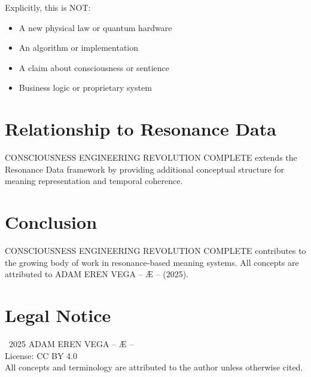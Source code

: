 \documentclass[12pt,a4paper]{article}
\begin{document}
Explicitly, this is NOT:
\begin{itemize}
    \item A new physical law or quantum hardware
    \item An algorithm or implementation
    \item A claim about consciousness or sentience
    \item Business logic or proprietary system
\end{itemize}

\section{Relationship to Resonance Data}

CONSCIOUSNESS ENGINEERING REVOLUTION COMPLETE extends the Resonance Data framework by providing additional conceptual structure for meaning representation and temporal coherence.

\section{Conclusion}

CONSCIOUSNESS ENGINEERING REVOLUTION COMPLETE contributes to the growing body of work in resonance-based meaning systems. All concepts are attributed to ADAM EREN VEGA – Æ – (2025).

\section*{Legal Notice}

\textcopyright\ 2025 ADAM EREN VEGA – Æ –\\
License: CC BY 4.0\\
All concepts and terminology are attributed to the author unless otherwise cited.
\end{document}
